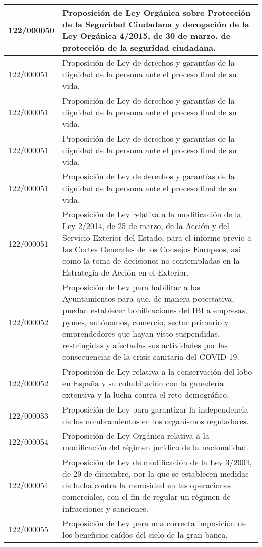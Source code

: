 {\begin{table}[H]
\begin{center}
\begin{tabularx}{\linewidth}{| l | X |}
\hline
122/000050 & Proposición de Ley Orgánica sobre Protección de la Seguridad Ciudadana y derogación de la Ley Orgánica 4/2015, de 30 de marzo, de protección de la seguridad ciudadana. \\
\hline
122/000051 & Proposición de Ley de derechos y garantías de la dignidad de la persona ante el proceso final de su vida. \\
\hline
122/000051 & Proposición de Ley de derechos y garantías de la dignidad de la persona ante el proceso final de su vida. \\
\hline
122/000051 & Proposición de Ley de derechos y garantías de la dignidad de la persona ante el proceso final de su vida. \\
\hline
122/000051 & Proposición de Ley de derechos y garantías de la dignidad de la persona ante el proceso final de su vida. \\
\hline
122/000051 & Proposición de Ley relativa a la modificación de la Ley 2/2014, de 25 de marzo, de la Acción y del Servicio Exterior del Estado, para el informe previo a las Cortes Generales de los Consejos Europeos, así como la toma de decisiones no contempladas en la Estrategia de Acción en el Exterior. \\
\hline
122/000052 & Proposición de Ley para habilitar a los Ayuntamientos para que, de manera potestativa, puedan establecer bonificaciones del IBI a empresas, pymes, autónomos, comercio, sector primario y emprendedores que hayan visto suspendidas, restringidas y afectadas sus actividades por las consecuencias de la crisis sanitaria del COVID-19. \\
\hline
122/000052 & Proposición de Ley relativa a la conservación del lobo en España y su cohabitación con la ganadería extensiva y la lucha contra el reto demográfico. \\
\hline
122/000053 & Proposición de Ley para garantizar la independencia de los nombramientos en los organismos reguladores. \\
\hline
122/000054 & Proposición de Ley Orgánica relativa a la modificación del régimen jurídico de la nacionalidad. \\
\hline
122/000054 & Proposición de Ley de modificación de la Ley 3/2004, de 29 de diciembre, por la que se establecen medidas de lucha contra la morosidad en las operaciones comerciales, con el fin de regular un régimen de infracciones y sanciones. \\
\hline
122/000055 & Proposición de Ley para una correcta imposición de los beneficios caídos del cielo de la gran banca. \\

\end{tabularx}
\end{center}
\end{table}}
